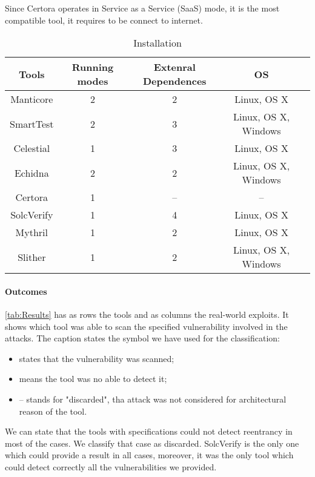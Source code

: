 Since Certora operates in Service as a Service (SaaS) mode, it is the most compatible tool, it requires to be connect to internet.

\begin{center}
    \begin{table*}
        \caption{Installation}
        \label{tab:Installation}
        \begin{tabular}{ccccc}
        \toprule
            Tools  &  Running modes & Extenral Dependences & OS \\
            \midrule
            Manticore & 2 & 2 & Linux, OS X\\
            SmartTest & 2 & 3 & Linux, OS X, Windows \\
            Celestial & 1 & 3 & Linux, OS X\\
            Echidna & 2 & 2 & Linux, OS X, Windows\\
            Certora & 1 & -- & -- \\ 
            SolcVerify & 1 & 4  &  Linux, OS X \\
            Mythril  & 1 & 2  &  Linux, OS X \\ 
            Slither & 1 & 2 & Linux, OS X, Windows \\   
        \bottomrule
        \end{tabular}
    \end{table*}
    \end{center}

\paragraph{Outcomes} \autoref{tab:Results} has as rows the tools and as columns the real-world exploits. 
It shows which tool was able to scan the specified vulnerability involved in the attacks.  The caption states the symbol we have used for the classification:
\begin{itemize}
    \item \checkmark states that the vulnerability was scanned;
    \item \xmark means the tool was no able to detect it;
    \item -- stands for "discarded", tha attack was not considered for architectural reason of the tool.
\end{itemize}


We can state that the tools with specifications could not detect reentrancy in most of the cases. We classify that case as discarded. 
SolcVerify is the only one which could provide a result in all cases, moreover, it was the only tool which could detect correctly all the vulnerabilities we provided.

